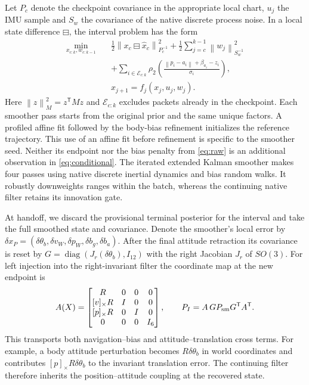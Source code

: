 \documentclass{IEEEtaes}
\newcommand{\norm}[1]{\left\lVert#1\right\rVert}
\newcommand{\sk}[1]{[#1]_\times}
\newcommand{\trans}{^{\mathsf T}}
\begin{document}
Let \(P_c\) denote the checkpoint covariance in the appropriate local chart, \(u_j\) the IMU sample and \(S_w\) the covariance of the native discrete process noise. In a local state difference \(\boxminus\), the interval problem has the form
\begin{align}
 \min_{x_{c:k},w_{c:k-1}}\quad&
 \tfrac12\norm{x_c\boxminus\hat x_c}_{P_c^{-1}}^2
 +\tfrac12\sum_{j=c}^{k-1}\norm{w_j}_{S_w^{-1}}^2 \nonumber\\
 &+\sum_{i\in\mathcal E_{c:k}}\rho_2\!\left(
 \frac{\norm{p_i-a_i}+\beta_{a_i}-z_i}{\sigma_i}\right),
 \label{eq:conditional}\\[-2pt]
 & x_{j+1}= f_j(x_j,u_j,w_j). \nonumber
\end{align}
Here \(\norm{z}_{M}^2=z\trans Mz\) and \(\mathcal E_{c:k}\) excludes packets already in the checkpoint. Each smoother pass starts from the original prior and the same unique factors. A profiled affine fit followed by the body-bias refinement initializes the reference trajectory. This use of an affine fit before refinement is specific to the smoother seed. Neither its endpoint nor the bias penalty from \eqref{eq:raw} is an additional observation in \eqref{eq:conditional}. The iterated extended Kalman smoother makes four passes using native discrete inertial dynamics and bias random walks. It robustly downweights ranges within the batch, whereas the continuing native filter retains its innovation gate.

At handoff, we discard the provisional terminal posterior for the interval and take the full smoothed state and covariance. Denote the smoother's local error by \(\delta x_P=(\delta\theta_b,\delta v_W,\delta p_W,\delta b_g,\delta b_a)\). After the final attitude retraction its covariance is reset by \(G=\operatorname{diag}(J_r(\delta\theta_b),I_{12})\) with the right Jacobian \(J_r\) of \(SO(3)\). For left injection into the right-invariant filter the coordinate map at the new endpoint is
\begin{equation}
 A(X)=\begin{bmatrix}
 R&0&0&0\\ \sk{v}R&I&0&0\\ \sk{p}R&0&I&0\\
 0&0&0&I_6
 \end{bmatrix},\qquad
 P_I=A\,G P_{\rm sm}G\trans A\trans . \label{eq:cov}
\end{equation}
This transports both navigation--bias and attitude--translation cross terms. For example, a body attitude perturbation becomes \(R\delta\theta_b\) in world coordinates and contributes \(\sk{p}R\delta\theta_b\) to the invariant translation error. The continuing filter therefore inherits the position--attitude coupling at the recovered state.
\end{document}
